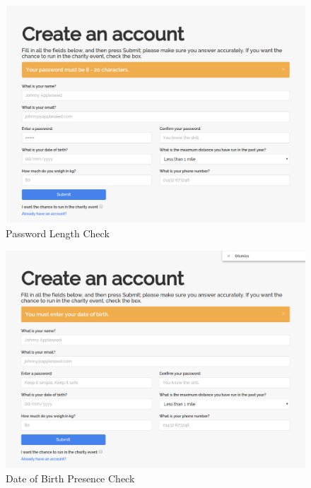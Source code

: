 \documentclass{article}[12pt,a4paper]
\begin{document}
\begin{figure}[h!]
  \includegraphics[scale=0.25]{images/testing/registration_validation/password_length}
  \caption{Password Length Check}
\end{figure}

\begin{figure}[h!]
  \includegraphics[scale=0.25]{images/testing/registration_validation/dob_presence}
  \caption{Date of Birth Presence Check}
\end{figure}
\end{document}
